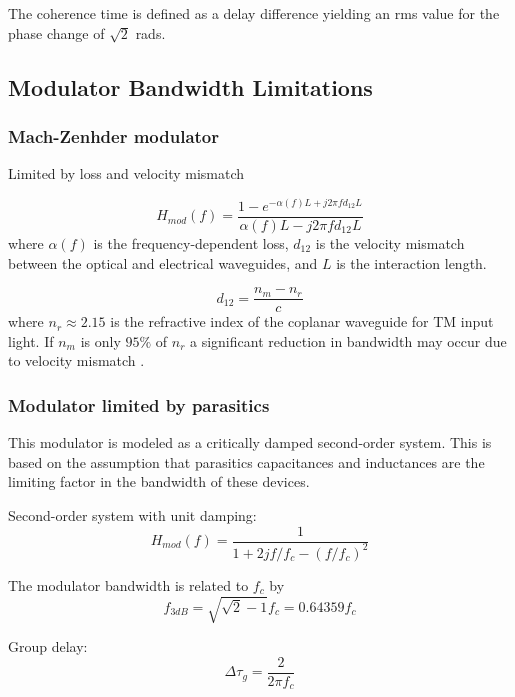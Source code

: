 \documentclass[a4paper]{article}
\begin{document}
The coherence time is defined as a delay difference yielding an rms value for the phase change of $\sqrt{2}$ rads.

\subsection{Modulator Bandwidth Limitations}

\subsubsection{Mach-Zenhder modulator}
\cite{Barros2009, Ho2005}

Limited by loss and velocity mismatch

\begin{equation}
H_{mod}(f) = \frac{1-e^{-\alpha(f)L+j2\pi fd_{12}L}}{\alpha(f)L-j2\pi fd_{12}L}
\end{equation}
where $\alpha(f)$ is the frequency-dependent loss, $d_{12}$ is the velocity mismatch between the optical and electrical waveguides, and $L$ is the interaction length.

\begin{equation}
d_{12} = \frac{n_m-n_r}{c}
\end{equation}
where $n_r \approx 2.15$ is the refractive index of the coplanar waveguide for TM input light. If $n_m$ is only $95\%$ of $n_r$ a significant reduction in bandwidth may occur due to velocity mismatch \cite{Ho2005}.

\subsubsection{Modulator limited by parasitics}
This modulator is modeled as a critically damped second-order system. This is based on the assumption that parasitics capacitances and inductances are the limiting factor in the bandwidth of these devices.

Second-order system with unit damping:
\begin{equation}
H_{mod}(f) =  \frac{1}{1 + 2jf/f_c - (f/f_c)^2}
\end{equation}

The modulator bandwidth is related to $f_c$ by
\begin{equation}
f_{3dB} = \sqrt{\sqrt{2}-1}f_c = 0.64359f_c
\end{equation}

Group delay:
\begin{equation}
\Delta\tau_g = \frac{2}{2\pi f_c}
\end{equation}
\end{document}
